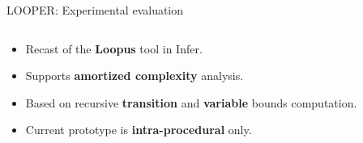 \documentclass[10pt, usenames, dvipsnames, aspectratio=169]{beamer}
\begin{document}
\begin{frame}{LOOPER: Experimental evaluation}
    \begin{columns}
        \hspace{-1em}

        \begin{column}{0.55 \textwidth}
            \vspace{1.2em}
            \large

            \begin{itemize}
                \item
                    Recast of the \alert{\textbf{Loopus}} tool in Infer.
                    \vspace{.5em}

                \item
                    Supports \alert{\textbf{amortized complexity}} analysis.
                    \vspace{.5em}

                \item
                    Based on recursive \alert{\textbf{transition}} and
                    \alert{\textbf{variable}} bounds computation.
                    \vspace{.5em}

                \item
                    Current prototype is \alert{\textbf{intra-procedural}}
                    only.
            \end{itemize}

            \fontsize{11}{11}
        \end{column}

        \begin{column}{0.45 \textwidth}
            \large


\end{column}
\end{columns}
\end{frame}
\end{document}
